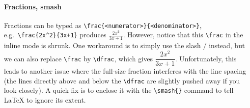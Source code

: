 \paragraph{Fractions, smash}
Fractions can be typed as \texttt{\textbackslash frac\{<numerator>\}\{<deno\allowbreak minator>\}}, e.g.\ \texttt{\textbackslash frac\{2x\^{}2\}\{3x+1\}} produces $\frac{2x^2}{3x+1}$. However, notice that this \texttt{\textbackslash frac} in the inline mode is shrunk. One workaround is to simply use the slash $/$ instead, but we can also replace \texttt{\textbackslash frac} by \texttt{\textbackslash dfrac}, which gives $\dfrac{2x^2}{3x+1}$. Unfortunately, this leads to another issue where the full-size fraction interferes with the line spacing (the lines directly above and below the \texttt{\textbackslash dfrac} are slightly pushed away if you look closely). A quick fix is to enclose it with the \texttt{\textbackslash smash\{\}} command to tell \LaTeX{} to ignore its extent.

